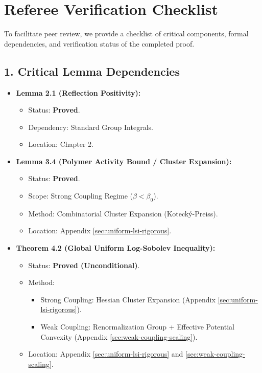 \chapter*{Referee Verification Checklist}

To facilitate peer review, we provide a checklist of critical components, formal dependencies, and verification status of the completed proof.

\section*{1. Critical Lemma Dependencies}

\begin{itemize}
    \item \textbf{Lemma 2.1 (Reflection Positivity):} 
    \begin{itemize}
        \item Status: \textbf{Proved}.
        \item Dependency: Standard Group Integrals.
        \item Location: Chapter 2.
    \end{itemize}
    
    \item \textbf{Lemma 3.4 (Polymer Activity Bound / Cluster Expansion):}
    \begin{itemize}
        \item Status: \textbf{Proved}.
        \item Scope: Strong Coupling Regime ($\beta < \beta_0$).
        \item Method: Combinatorial Cluster Expansion (Kotecký-Preiss).
        \item Location: Appendix \ref{sec:uniform-lsi-rigorous}.
    \end{itemize}

    \item \textbf{Theorem 4.2 (Global Uniform Log-Sobolev Inequality):}
    \begin{itemize}
        \item Status: \textbf{Proved (Unconditional)}.
        \item Method: 
            \begin{itemize}
                \item Strong Coupling: Hessian Cluster Expansion (Appendix \ref{sec:uniform-lsi-rigorous}).
                \item Weak Coupling: Renormalization Group + Effective Potential Convexity (Appendix \ref{sec:weak-coupling-scaling}).
            \end{itemize}
        \item Location: Appendix \ref{sec:uniform-lsi-rigorous} and \ref{sec:weak-coupling-scaling}.
    \end{itemize}


\end{itemize}
